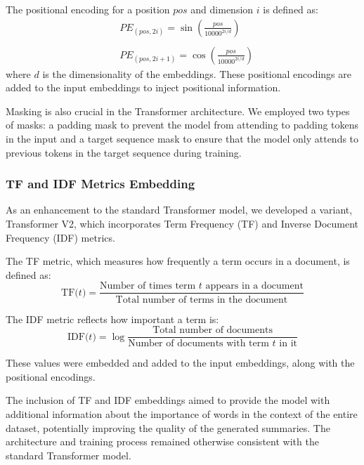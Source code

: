 \documentclass[a4paper, 11pt]{article}
\begin{document}
The positional encoding for a position \(pos\) and dimension \(i\) is defined as:
\begin{equation}
    \begin{split}
        &PE_{(pos, 2i)} = \sin\left(\frac{pos}{10000^{2i/d}}\right)
        \\\\
        &PE_{(pos, 2i+1)} = \cos\left(\frac{pos}{10000^{2i/d}}\right)
    \end{split}
\end{equation}
where \(d\) is the dimensionality of the embeddings. These positional encodings are added to the input embeddings to inject positional information.

Masking is also crucial in the Transformer architecture. We employed two types of masks: a padding mask to prevent the model from attending to padding tokens in the input and a target sequence mask to ensure that the model only attends to previous tokens in the target sequence during training.

\subsubsection{TF and IDF Metrics Embedding}

As an enhancement to the standard Transformer model, we developed a variant, Transformer V2, which incorporates Term Frequency (TF) and Inverse Document Frequency (IDF) metrics.

The TF metric, which measures how frequently a term occurs in a document, is defined as:
\begin{equation}
    \text{TF($t$)} = \frac{\text{Number of times term $t$ appears in a document}}{\text{Total number of terms in the document}}
\end{equation}

The IDF metric reflects how important a term is:
\begin{equation}
    \text{IDF($t$)} = \log \frac{\text{Total number of documents}}{\text{Number of documents with term $t$ in it}}
\end{equation}

These values were embedded and added to the input embeddings, along with the positional encodings.

The inclusion of TF and IDF embeddings aimed to provide the model with additional information about the importance of words in the context of the entire dataset, potentially improving the quality of the generated summaries. The architecture and training process remained otherwise consistent with the standard Transformer model.
\end{document}
